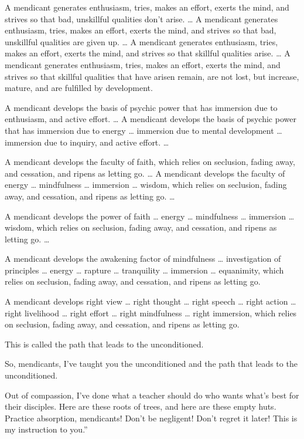 \documentclass[12pt,openany]{book}%
\begin{document}
A mendicant generates enthusiasm, tries, makes an effort, exerts the mind, and strives so that bad, unskillful qualities don’t arise. … A mendicant generates enthusiasm, tries, makes an effort, exerts the mind, and strives so that bad, unskillful qualities are given up. … A mendicant generates enthusiasm, tries, makes an effort, exerts the mind, and strives so that skillful qualities arise. … A mendicant generates enthusiasm, tries, makes an effort, exerts the mind, and strives so that skillful qualities that have arisen remain, are not lost, but increase, mature, and are fulfilled by development. 

A mendicant develops the basis of psychic power that has immersion due to enthusiasm, and active effort. … A mendicant develops the basis of psychic power that has immersion due to energy … immersion due to mental development … immersion due to inquiry, and active effort. … 

A mendicant develops the faculty of faith, which relies on seclusion, fading away, and cessation, and ripens as letting go. … A mendicant develops the faculty of energy … mindfulness … immersion … wisdom, which relies on seclusion, fading away, and cessation, and ripens as letting go. … 

A mendicant develops the power of faith … energy … mindfulness … immersion … wisdom, which relies on seclusion, fading away, and cessation, and ripens as letting go. … 

A mendicant develops the awakening factor of mindfulness … investigation of principles … energy … rapture … tranquility … immersion … equanimity, which relies on seclusion, fading away, and cessation, and ripens as letting go. 

A mendicant develops right view … right thought … right speech … right action … right livelihood … right effort … right mindfulness … right immersion, which relies on seclusion, fading away, and cessation, and ripens as letting go. 

This is called the path that leads to the unconditioned. 

So, mendicants, I’ve taught you the unconditioned and the path that leads to the unconditioned. 

Out of compassion, I’ve done what a teacher should do who wants what’s best for their disciples. Here are these roots of trees, and here are these empty huts. Practice absorption, mendicants! Don’t be negligent! Don’t regret it later! This is my instruction to you.” 
\end{document}
